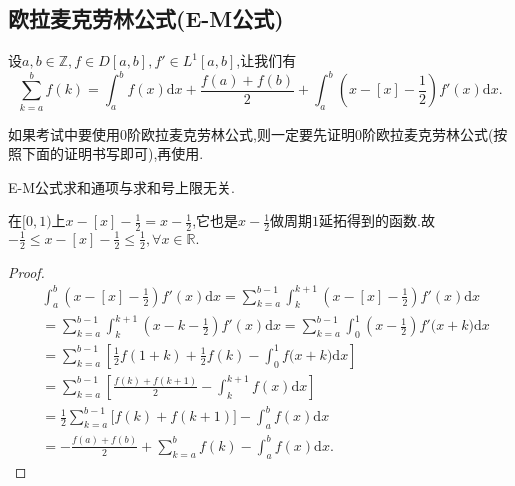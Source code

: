 \documentclass[../../main.tex]{subfiles}
\begin{document}
\subsection{欧拉麦克劳林公式(E-M公式)}


\begin{proposition}\label{proposition:0阶欧拉麦克劳林公式(0阶E-M公式)}
设\(a,b\in\mathbb{Z}, f\in D[a,b], f'\in L^1[a,b]\),让我们有
\[
\sum_{k = a}^{b}f(k)=\int_{a}^{b}f(x)\mathrm{d}x+\frac{f(a)+f(b)}{2}+\int_{a}^{b}\left(x - [x]-\frac{1}{2}\right)f'(x)\mathrm{d}x.
\]
\end{proposition}
\begin{remark}
如果考试中要使用0阶欧拉麦克劳林公式,则一定要先证明0阶欧拉麦克劳林公式(按照下面的证明书写即可),再使用.

E-M公式求和通项与求和号上限无关.
\end{remark}
\begin{note}
在\([0,1)\)上\(x - [x]-\frac{1}{2}=x - \frac{1}{2}\),它也是\(x - \frac{1}{2}\)做周期\(1\)延拓得到的函数.故$-\frac{1}{2}\leqslant x-[x]-\frac{1}{2}\leqslant \frac{1}{2},\forall x\in \mathbb{R} .$
\end{note}
\begin{proof}
\begin{align*}
&\int_a^b{\left( x-[x]-\frac{1}{2} \right) f'(x)\mathrm{d}x}=\sum_{k=a}^{b-1}{\int_k^{k+1}{\left( x-[x]-\frac{1}{2} \right) f'(x)\mathrm{d}x}}
\\
&=\sum_{k=a}^{b-1}{\int_k^{k+1}{\left( x-k-\frac{1}{2} \right) f'(x)\mathrm{d}x}}=\sum_{k=a}^{b-1}{\int_0^1{\left( x-\frac{1}{2} \right) f'(x}}+k)\mathrm{d}x
\\
&=\sum_{k=a}^{b-1}{\left[ \frac{1}{2}f(1+k)+\frac{1}{2}f(k)-\int_0^1{f(x}+k)\mathrm{d}x \right]}
\\
&=\sum_{k=a}^{b-1}{\left[ \frac{f(k)+f(k+1)}{2}-\int_k^{k+1}{f(x)\mathrm{d}x} \right]}
\\
&=\frac{1}{2}\sum_{k=a}^{b-1}{[f(k)}+f(k+1)]-\int_a^b{f(x)\mathrm{d}x}
\\
&=-\frac{f(a)+f(b)}{2}+\sum_{k=a}^b{f(k)}-\int_a^b{f(x)\mathrm{d}x}.
\end{align*}
\end{proof}
\end{document}
